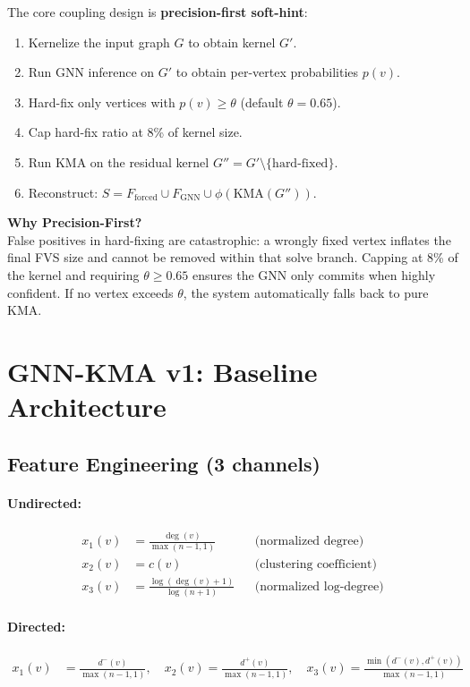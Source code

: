 \documentclass[10pt,a4paper]{report}
\theoremstyle{definition}
\newcommand{\infobox}[2]{%
  \begin{center}
    \colorbox{buetblue!8}{%
      \begin{minipage}{0.93\textwidth}
        \vspace{4pt}
        \textbf{\color{buetblue}#1}\\[2pt]
        #2
        \vspace{4pt}
      \end{minipage}%
    }
  \end{center}
}
\begin{document}
The core coupling design is \textbf{precision-first soft-hint}:

\begin{enumerate}
	\item Kernelize the input graph $G$ to obtain kernel $G'$.
	\item Run GNN inference on $G'$ to obtain per-vertex probabilities $p(v)$.
	\item Hard-fix only vertices with $p(v) \geq \theta$ (default $\theta = 0.65$).
	\item Cap hard-fix ratio at 8\% of kernel size.
	\item Run KMA on the residual kernel $G'' = G' \setminus \{\text{hard-fixed}\}$.
	\item Reconstruct: $S = F_{\text{forced}} \cup F_{\text{GNN}} \cup \phi(\text{KMA}(G''))$.
\end{enumerate}

\infobox{Why Precision-First?}{
	False positives in hard-fixing are catastrophic: a wrongly fixed vertex inflates the final FVS size and cannot be removed within that solve branch. Capping at 8\% of the kernel and requiring $\theta \geq 0.65$ ensures the GNN only commits when highly confident. If no vertex exceeds $\theta$, the system automatically falls back to pure KMA.
}

\section{GNN-KMA v1: Baseline Architecture}

\subsection{Feature Engineering (3 channels)}

\paragraph{Undirected:}
\begin{align}
	x_1(v) & = \frac{\deg(v)}{\max(n-1, 1)}      &  & \text{(normalized degree)}      \\
	x_2(v) & = c(v)                              &  & \text{(clustering coefficient)} \\
	x_3(v) & = \frac{\log(\deg(v)+1)}{\log(n+1)} &  & \text{(normalized log-degree)}
\end{align}

\paragraph{Directed:}
\begin{align}
	x_1(v) & = \frac{d^-(v)}{\max(n-1, 1)}, \quad x_2(v) = \frac{d^+(v)}{\max(n-1, 1)}, \quad x_3(v) = \frac{\min(d^-(v),d^+(v))}{\max(n-1,1)}
\end{align}
\end{document}
